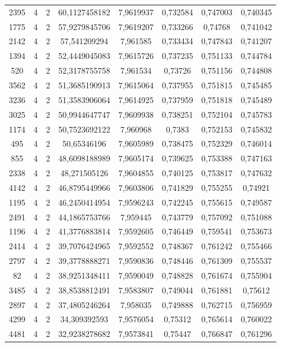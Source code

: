 \begin{longtable}{|c|c|c|c|c|c|c|c|}
2395 & 4 & 2 & 60,1127458182 & 7,9619937 & 0,732584 & 0,747003 & 0,740345 \\
1775 & 4 & 2 & 57,9279845706 & 7,9619207 & 0,733266 & 0,74768 & 0,741042 \\
2142 & 4 & 2 & 57,541209294 & 7,961585 & 0,733434 & 0,747843 & 0,741207 \\
1394 & 4 & 2 & 52,4449045083 & 7,9615726 & 0,737235 & 0,751133 & 0,744784 \\
520 & 4 & 2 & 52,3178755758 & 7,961534 & 0,73726 & 0,751156 & 0,744808 \\
3562 & 4 & 2 & 51,3685190913 & 7,9615064 & 0,737955 & 0,751815 & 0,745485 \\
3236 & 4 & 2 & 51,3583906064 & 7,9614925 & 0,737959 & 0,751818 & 0,745489 \\
3025 & 4 & 2 & 50,9944647747 & 7,9609938 & 0,738251 & 0,752104 & 0,745783 \\
1174 & 4 & 2 & 50,7523692122 & 7,960968 & 0,7383 & 0,752153 & 0,745832 \\
495 & 4 & 2 & 50,65346196 & 7,9605989 & 0,738475 & 0,752329 & 0,746014 \\
855 & 4 & 2 & 48,6098188989 & 7,9605174 & 0,739625 & 0,753388 & 0,747163 \\
2338 & 4 & 2 & 48,271505126 & 7,9604855 & 0,740125 & 0,753817 & 0,747632 \\
4142 & 4 & 2 & 46,8795449966 & 7,9603806 & 0,741829 & 0,755255 & 0,74921 \\
1195 & 4 & 2 & 46,2450414954 & 7,9596243 & 0,742245 & 0,755615 & 0,749587 \\
2491 & 4 & 2 & 44,1865753766 & 7,959445 & 0,743779 & 0,757092 & 0,751088 \\
1196 & 4 & 2 & 41,3776883814 & 7,9592605 & 0,746449 & 0,759541 & 0,753673 \\
2414 & 4 & 2 & 39,7076424965 & 7,9592552 & 0,748367 & 0,761242 & 0,755466 \\
2797 & 4 & 2 & 39,3778888271 & 7,9590836 & 0,748446 & 0,761309 & 0,755537 \\
82 & 4 & 2 & 38,9251348411 & 7,9590049 & 0,748828 & 0,761674 & 0,755904 \\
3485 & 4 & 2 & 38,8538812491 & 7,9583807 & 0,749044 & 0,761881 & 0,75612 \\
2897 & 4 & 2 & 37,4805246264 & 7,958035 & 0,749888 & 0,762715 & 0,756959 \\
4299 & 4 & 2 & 34,309392593 & 7,9576054 & 0,75312 & 0,765614 & 0,760022 \\
4481 & 4 & 2 & 32,9238278682 & 7,9573841 & 0,75447 & 0,766847 & 0,761296 \\

\end{longtable}
